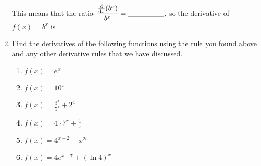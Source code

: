 \documentclass[letterpaper,12pt]{article}
\begin{document}
\begin{enumerate}
This means that the ratio $\displaystyle\frac{\frac{\rm d}{{\rm d} x}(b^x)}{b^x}=\underline{\hspace{.7in}}$, so the derivative of $f(x)=b^x$ is 
\begin{center}
\end{center}
\newpage
\item Find the derivatives of the following functions using the rule you found above and any other derivative rules that we have discussed.
	\begin{enumerate}
	\item $f(x)=e^x$
\vfill
	\item $f(x)=10^x$
\vfill
	\item $f(x)=\frac{3^x}{5^x}+2^4$
\vfill
\newpage
	\item $f(x)=4\cdot 7^x+\frac{1}{x}$
\vfill
	\item $f(x)=4^{x+2}+x^{2e}$
\vfill
	\item $f(x)=4e^{x+7}+(\ln 4)^x$
	\end{enumerate}
\vfill
\end{enumerate}
\end{document}
